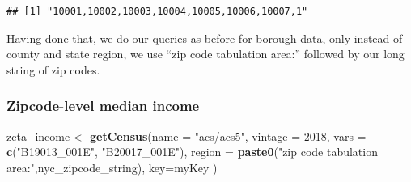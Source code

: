 \documentclass[openany]{book}
\newenvironment{Shaded}{\begin{snugshade}}{\end{snugshade}}
\newcommand{\CommentTok}[1]{\textcolor[rgb]{0.56,0.35,0.01}{\textit{#1}}}
\newcommand{\DataTypeTok}[1]{\textcolor[rgb]{0.13,0.29,0.53}{#1}}
\newcommand{\DecValTok}[1]{\textcolor[rgb]{0.00,0.00,0.81}{#1}}
\newcommand{\KeywordTok}[1]{\textcolor[rgb]{0.13,0.29,0.53}{\textbf{#1}}}
\newcommand{\NormalTok}[1]{#1}
\newcommand{\OperatorTok}[1]{\textcolor[rgb]{0.81,0.36,0.00}{\textbf{#1}}}
\newcommand{\StringTok}[1]{\textcolor[rgb]{0.31,0.60,0.02}{#1}}
\begin{document}
\begin{Shaded}
\end{Shaded}

\begin{verbatim}
## [1] "10001,10002,10003,10004,10005,10006,10007,1"
\end{verbatim}

Having done that, we do our queries as before for borough data, only instead of county and state region, we use ``zip code tabulation area:'' followed by our long string of zip codes.

\hypertarget{zipcode-level-median-income}{%
\subsubsection*{Zipcode-level median income}\label{zipcode-level-median-income}}

\begin{Shaded}
\begin{Highlighting}[]
\NormalTok{zcta_income <-}\StringTok{ }\KeywordTok{getCensus}\NormalTok{(}\DataTypeTok{name =} \StringTok{"acs/acs5"}\NormalTok{,}
                         \DataTypeTok{vintage =} \DecValTok{2018}\NormalTok{,}
                         \DataTypeTok{vars =} \KeywordTok{c}\NormalTok{(}\StringTok{"B19013_001E"}\NormalTok{, }\StringTok{"B20017_001E"}\NormalTok{),}
                         \DataTypeTok{region =} \KeywordTok{paste0}\NormalTok{(}\StringTok{"zip code tabulation area:"}\NormalTok{,nyc_zipcode_string),}
                         \DataTypeTok{key=}\NormalTok{myKey}
\NormalTok{                         )}
\end{Highlighting}
\end{Shaded}
\end{document}
